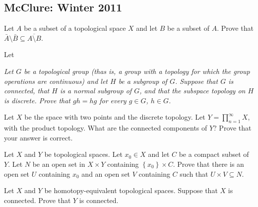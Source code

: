 \subsection{McClure: Winter 2011}
\setcounter{exercise}{0}

\begin{problem}
  Let \(A\) be a subset of a topological space \(X\) and let \(B\) be a
  subset of \(A\). Prove that
  \(\bar A\setminus\bar B\subseteq\overline{A\setminus B}\).
\end{problem}
\begin{solution}
  Let
\end{solution}

\begin{problem}
  \emph{Let \(G\) be a topological group (thas is, a group with a topology for
  which the group operations are continuous) and let \(H\) be a subgroup of
  \(G\). Suppose that \(G\) is connected, that \(H\) is a normal subgroup
  of \(G\), and that the subspace topology on \(H\) is discrete. Prove that
  \(g h=hg\) for every \(g\in G\), \(h\in G\).}
\end{problem}
\begin{solution}
\end{solution}

\begin{problem}
  Let \(X\) be the space with two points and the discrete topology. Let
  \(Y=\prod_{n=1}^\infty X\), with the product topology. What are the
  connected components of \(Y\)? Prove that your answer is correct.
\end{problem}
\begin{solution}
\end{solution}

\begin{problem}
  Let \(X\) and \(Y\) be topological spaces. Let \(x_0\in X\) and let \(C\)
  be a compact subset of \(Y\). Let \(N\) be an open set in \(X\times Y\)
  containing \(\left\{x_0\right\}\times C\). Prove that there is an open
  set \(U\) containing \(x_0\) and an open set \(V\) containing \(C\) such
  that \(U\times V\subseteq N\).
\end{problem}
\begin{solution}
\end{solution}

\begin{problem}
  Let \(X\) and \(Y\) be homotopy-equivalent topological spaces. Suppose
  that \(X\) is connected. Prove that \(Y\) is connected.
\end{problem}
\begin{solution}
\end{solution}

